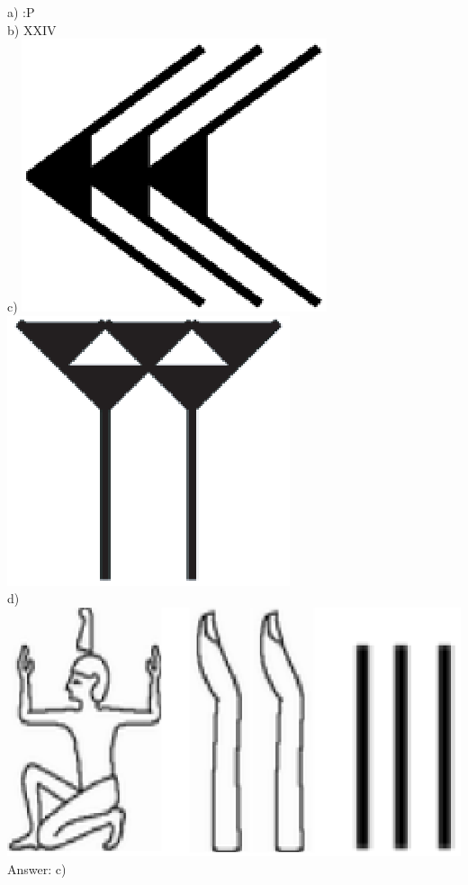 \documentclass[letterpaper, 12pt]{article}
\begin{document}
a) :\textsf{P}\\
b) XXIV\\
c) \includegraphics[scale=0.1]{30.eps} \includegraphics[scale=0.1]{5.eps}\\
d) \includegraphics[scale=0.15]{nombregyptien.eps}\\

Answer: c)\\
\end{document}
